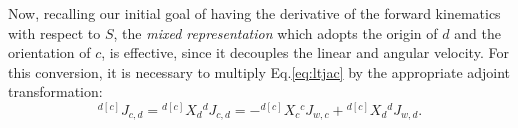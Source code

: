 Now, recalling our initial goal of having the derivative of the forward kinematics with respect to $S$, the \textit{mixed representation} which adopts the origin of $d$ and the orientation of $c$, is effective, since it decouples the linear and angular velocity. For this conversion, it is necessary to multiply Eq.\eqref{eq:ltjac} by the appropriate adjoint transformation:
\begin{equation}\label{eq:rel_jac}
{}^{d[c]} J_{c,d} = {}^{d[c]} X_d {}^d J_{c,d} = -{}^{d[c]} X_c {}^c J_{w,c} + {}^{d[c]} X_d {}^d J_{w,d}.
\end{equation}